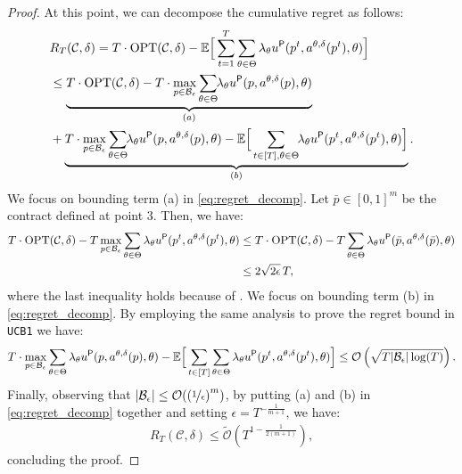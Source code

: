 \begin{proof}
	At this point, we can decompose the cumulative regret as follows:
	\begin{align}
		&R_T(\mathcal{C},\delta)   =   T \cdot \textnormal{OPT}(\mathcal{C},\delta) -  \mathbb{E}\Big[\sum_{t=1}^{T} \sum_{\theta \in \Theta} \lambda_\theta u^{\mathsf{P}}(p^t, a^{\theta,\delta}(p^t),\theta)  \Big] \nonumber\\
		& \le \underbrace{T \cdot \textnormal{OPT}(\mathcal{C},\delta)  - T \cdot \max_{p \in \mathcal{B}_\epsilon} \sum_{\theta \in \Theta} \hspace{-1mm} \lambda_\theta u^{\mathsf{P}}(p,a^{\theta,\delta}(p),\theta) }_{(a)} \\
		&+ \underbrace{ T\cdot \max_{p \in \mathcal{B}_\epsilon}  \sum_{\theta \in \Theta} \hspace{-1mm} \lambda_\theta u^{\mathsf{P}}(p,a^{\theta,\delta}(p),\theta) -  \mathbb{E}\Big[ \sum_{t \in [T],\theta \in \Theta} \hspace{-1mm} \lambda_\theta u^{\mathsf{P}}(p^t, a^{\theta,\delta}(p^t),\theta) \Big]}_{(b)}. \label{eq:regret_decomp}
	\end{align}
	We focus on bounding term (a) in \cref{eq:regret_decomp}.
	Let $\bar p \in [0,1]^m$ be the contract defined at point 3. Then, we have: 
	\begin{align*}
		T \cdot \textnormal{OPT}(\mathcal{C},\delta)- T \max_{p \in \mathcal{B}_\epsilon}   \sum_{\theta \in \Theta} \lambda_\theta  u^{\mathsf{P}}(p^t, a^{\theta,\delta}(p^t),\theta) 
		& \le  T \cdot \textnormal{OPT}(\mathcal{C},\delta)- T \sum_{\theta \in \Theta} \lambda_\theta  u^{\mathsf{P}}(\bar p, a^{\theta,\delta}(\bar p),\theta)  \\
		& \le  2 \sqrt{2\epsilon} \, T,
	\end{align*}
	where the last inequality holds because of .
	We focus on bounding term (b) in \cref{eq:regret_decomp}. By employing the same analysis to prove the regret bound in \texttt{UCB1} we have:
	\begin{equation}
		T \cdot \max_{p \in \mathcal{B}_\epsilon}  \sum_{\theta \in \Theta} \lambda_\theta u^{\mathsf{P}}(p,a^{\theta,\delta}(p),\theta) -  \mathbb{E}\Big[ \sum_{t \in [T]} \sum_{\theta \in \Theta} \lambda_\theta  u^{\mathsf{P}}(p^t, a^{\theta,\delta}(p^t),\theta) \Big] \le \mathcal{O}\left(\sqrt{ T |\mathcal{B}_\epsilon| \log(T ) }\right).
	\end{equation} 
	Finally, observing that $|\mathcal{B}_\epsilon| \le \mathcal{O}{((\nicefrac{1}{\epsilon})}^{m})$, by putting (a) and (b) in \cref{eq:regret_decomp} together and setting $\epsilon= T^{-\frac{1}{m+1}}$, we have:
	\begin{align*}
		R_T (\mathcal{C},\delta) \le \mathcal{\widetilde{O}} \left(   T^{1- \frac{1}{2(m+1)}}  \right),
	\end{align*}
	concluding the proof.
\end{proof}

